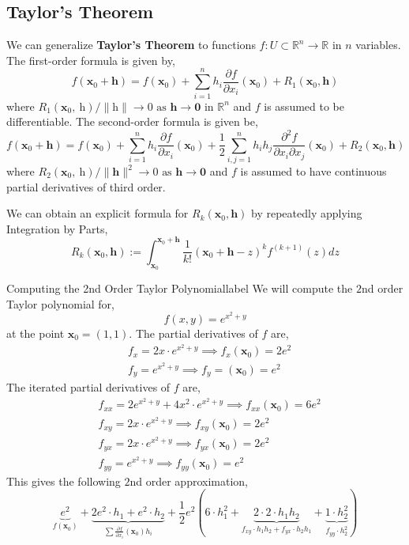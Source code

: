 \subsection{Taylor's Theorem}
We can generalize \textbf{Taylor's Theorem} to functions $f: U \subset \mathbb{R}^n \rightarrow \mathbb{R}$ in $n$ variables. The first-order formula is given by,
\[f\left(\mathbf{x}_0+\mathbf{h}\right)=f\left(\mathbf{x}_0\right)+\sum_{i=1}^n h_i \frac{\partial f}{\partial x_i}\left(\mathbf{x}_0\right)+R_1\left(\mathbf{x}_0, \mathbf{h}\right)\]
where $R_1\left(\mathbf{x}_0, \mathrm{~h}\right) /\|\mathrm{h}\| \rightarrow 0 \text { as } \mathbf{h} \rightarrow \mathbf{0} \text { in } \mathbb{R}^n$ and $f$ is assumed to be differentiable. The second-order formula is given be,
\[f\left(\mathbf{x}_0+\mathbf{h}\right)=f\left(\mathbf{x}_0\right)+\sum_{i=1}^n h_i \frac{\partial f}{\partial x_i}\left(\mathbf{x}_0\right)+\frac{1}{2} \sum_{i, j=1}^n h_i h_j \frac{\partial^2 f}{\partial x_i \partial x_j}\left(\mathbf{x}_0\right)+R_2\left(\mathbf{x}_0, \mathbf{h}\right)\]
where $R_2\left(\mathbf{x}_0, \mathrm{~h}\right) /\|\mathbf{h}\|^2 \rightarrow 0 \text { as } \mathbf{h} \rightarrow \mathbf{0}$ and $f$ is assumed to have continuous partial derivatives of third order.

\begin{rmk}
    We can obtain an explicit formula for $R_k(\mathbf{x}_0, \mathbf{h})$ by repeatedly applying Integration by Parts,
    \[R_k\left(\mathbf{x}_0, \mathbf{h}\right):=\int_{\mathbf{x}_0}^{\mathbf{x}_0+\mathbf{h}} \frac{1}{k !}\left(\mathbf{x}_0+\mathbf{h}-z\right)^k f^{(k+1)}(z) d z\]
\end{rmk}

\begin{ex}{Computing the 2nd Order Taylor Polynomial}{label}
    We will compute the $2$nd order Taylor polynomial for,
    \[f(x,y) = e^{x^2+y}\]
    at the point $\mathbf{x}_0 = (1,1)$. The partial derivatives of $f$ are,
    \begin{align*}
    &f_x=2 x \cdot e^{x^2+y} \implies f_x\left(\mathbf{x}_0\right)=2 e^2\\
    &f_y=e^{x^2+y} \implies f_y = \left(\mathbf{x}_0\right)=e^2
    \end{align*}
    The iterated partial derivatives of $f$ are,
    \begin{align*}
        &f_{x x}=2 e^{x^2+y}+4 x^2 \cdot e^{x^2+y} \implies f_{x x}\left(\mathbf{x}_0\right)=6 e^2\\
        &f_{x y}=2 x \cdot e^{x^2+y} \implies f_{x y}(\mathbf{x}_0)=2 e^2\\
        &f_{y x}=2 x \cdot e^{x^2+y}  \implies f_{y x}(\mathbf{x}_0)=2 e^2 \\
        &f_{y y}=e^{x^2+y} \implies f_{y y}\left(\mathbf{x}_0\right)=e^2
    \end{align*}
    This gives the following $2$nd order approximation,
    \[
    \underbrace{e^2}_{f\left(\mathbf{x}_0\right)}+ \underbrace{2 e^2 \cdot h_1 + e^2 \cdot h_2}_{\sum \frac{\partial f}{\partial x_i}\left(\mathbf{x}_0\right) h_i} + \frac{1}{2} e^2(6 \cdot h_1^2+ \underbrace{2 \cdot 2 \cdot h_1 h_2}_{f_{x y} \cdot h_1 h_2+f_{y x} \cdot h_2 h_1} +\underbrace{1 \cdot h_2^2}_{f_{y y} \cdot h_2^2})
    \]
\end{ex}